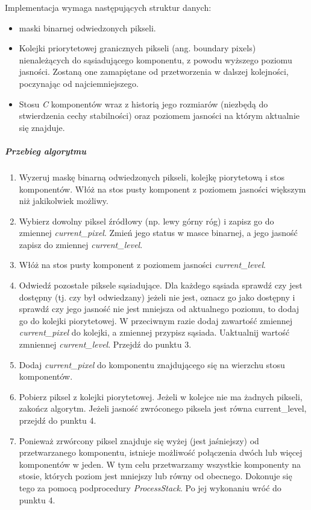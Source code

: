 Implementacja wymaga następujących struktur danych: \begin{itemize} \item maski
binarnej odwiedzonych pikseli. \item Kolejki priorytetowej granicznych pikseli
(ang. boundary pixels) nienależących do sąsiadującego komponentu, z powodu
wyższego poziomu jasności. Zostaną one zamapiętane od przetworzenia w dalszej
kolejności, poczynając od najciemniejszego. \item Stosu \textit{C} komponentów
wraz z historią jego rozmiarów (niezbędą do stwierdzenia cechy stabilności)
oraz poziomem jasności na którym aktualnie się znajduje.  \end{itemize}

\subparagraph{Przebieg algorytmu}

\begin{enumerate} \item Wyzeruj maskę binarną odwiedzonych pikseli, kolejkę
piorytetową i stos komponentów. Włóż na stos pusty komponent z poziomem
jasności większym niż jakikolwiek możliwy. \item Wybierz dowolny piksel
źródłowy (np. lewy górny róg) i zapisz go do zmiennej \textit{current\_pixel}.
Zmień jego status w masce binarnej, a jego jasność zapisz do zmiennej
\textit{current\_level}. \item Włóż na stos pusty komponent z poziomem jasności
\textit{current\_level}. \item Odwiedź pozostałe piksele sąsiadujące. Dla
każdego sąsiada sprawdź czy jest dostępny (tj. czy był odwiedzany) jeżeli nie
jest, oznacz go jako dostępny i sprawdź czy jego jasność nie jest mniejsza od
aktualnego poziomu, to dodaj go do kolejki piorytetowej. W przeciwnym razie
dodaj zawartość zmiennej \textit{current\_pixel} do kolejki, a zmiennej
przypisz sąsiada. Uaktualnij wartość zmniennej \textit{current\_level}. Przejdź
do punktu 3. \item Dodaj \textit{current\_pixel} do komponentu znajdującego się
na wierzchu stosu komponentów. \item Pobierz piksel z kolejki piorytetowej.
Jeżeli w kolejce nie ma żadnych pikseli, zakończ algorytm. Jeżeli jasność
zwróconego piksela jest równa current\_level, przejdź do punktu 4. \item
Ponieważ zrwórcony piksel znajduje się wyżej (jest jaśniejszy) od
przetwarzanego komponentu, istnieje możliwość połączenia dwóch lub więcej
komponentów w jeden. W tym celu przetwarzamy wszystkie komponenty na stosie,
których poziom jest mniejszy lub równy od obecnego. Dokonuje się tego za pomocą
podprocedury \textit{ProcessStack}. Po jej wykonaniu wróć do punktu 4. \end{enumerate}

